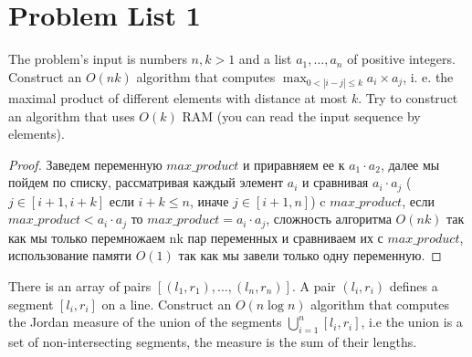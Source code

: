 \section{Problem List 1}

\begin{prob}
The problem's input is numbers $n, k>1$ and a list $a_1, \ldots, a_n$ of positive integers. Construct an $O(n k)$ algorithm that computes $\max_{0<|i-j| \leqslant k} a_i \times a_j$, i. e. the maximal product of different elements with distance at most $k$. Try to construct an algorithm that uses $O(k)$ RAM (you can read the input sequence by elements).
\end{prob}

\begin{proof}
Заведем переменную $max\_product$ и приравняем ее к $a_1 \cdot a_2$, далее мы пойдем по списку, рассматривая каждый элемент $a_i$ и сравнивая $a_i \cdot a_j$ ($j \in [i+1, i+k]$ если $i+k \leq n$, иначе $j \in [i+1, n]$) c $max\_product$, если $max\_product < a_i \cdot a_j$ то $max\_product = a_i \cdot a_j$, сложность алгоритма $O(nk)$ так как мы только перемножаем nk пар переменных и сравниваем их с $max\_product$, использование памяти $O(1)$ так как мы завели только одну переменную.
\end{proof}
\vskip 0.6in



\begin{prob}
There is an array of pairs $\left[\left(l_1, r_1\right), \ldots,\left(l_n, r_n\right)\right]$. A pair $\left(l_i, r_i\right)$ defines a segment $\left[l_i, r_i\right]$ on a line. Construct an $O(n \log n)$ algorithm that computes the Jordan measure of the union of the segments $\bigcup_{i=1}^n\left[l_i, r_i\right]$, i.e the union is a set of non-intersecting segments, the measure is the sum of their lengths.
\end{prob}

